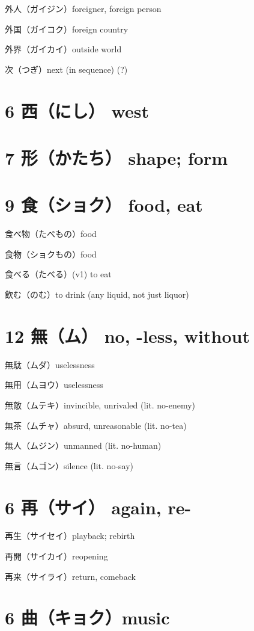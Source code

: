 外人（ガイジン）foreigner, foreign person

外国（ガイコク）foreign country

外界（ガイカイ）outside world

次（つぎ）next (in sequence) (?)

\section{6 西（にし） west}

\section{7 形（かたち） shape; form}

\section{9 食（ショク） food, eat}

食べ物（たべもの）food

食物（ショクもの）food

食べる（たべる）(v1) to eat

飲む（のむ）to drink (any liquid, not just liquor)

\section{12 無（ム） no, -less, without}

無駄（ムダ）uselessness

無用（ムヨウ）uselessness

無敵（ムテキ）invincible, unrivaled (lit. no-enemy)

無茶（ムチャ）absurd, unreasonable (lit. no-tea)

無人（ムジン）unmanned (lit. no-human)

無言（ムゴン）silence (lit. no-say)

\section{6 再（サイ） again, re-}

再生（サイセイ）playback; rebirth

再開（サイカイ）reopening

再来（サイライ）return, comeback

\section{6 曲（キョク）music}

